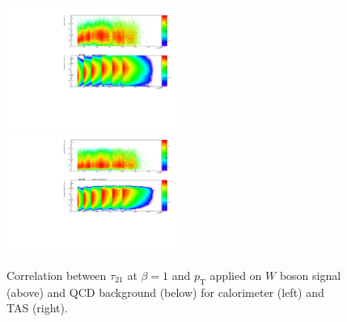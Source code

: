 \begin{figure}[htp]
\includegraphics[width=0.5\textwidth]{sascha_input/plots/W/beta1/scatter_plots/scatter_h_scatter_reco_nSub21.pdf}
\bigskip
\includegraphics[width=0.5\textwidth]{sascha_input/plots/W/beta1/scatter_plots/scatter_h_scatter_assisted_tj_nSub21.pdf} 
\caption{\footnotesize{Correlation between $\tau_{21}$ at $\beta=1$ and $p_{\mathrm{T}}$ applied on $W$ boson signal (above) and QCD background (below) for calorimeter (left) and TAS (right).}}\label{fig:correlation_tau21}
\end{figure}





